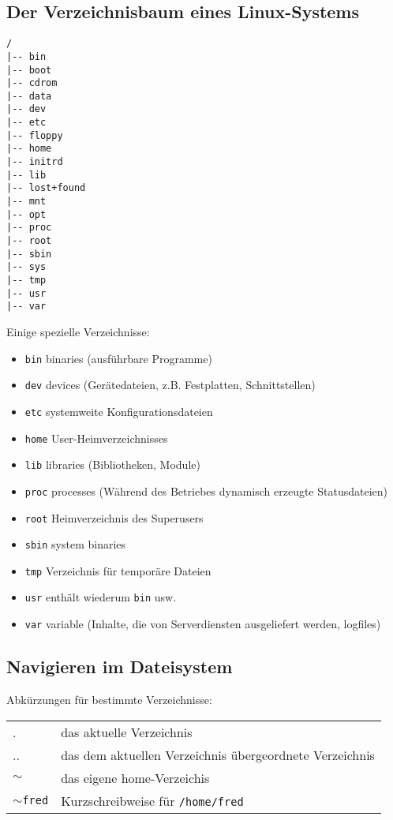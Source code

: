 \documentclass[11pt]{article}
\begin{document}
\subsection{Der Verzeichnisbaum eines Linux-Systems}
\begin{samepage}
\begin{verbatim}
/
|-- bin
|-- boot
|-- cdrom
|-- data
|-- dev
|-- etc
|-- floppy
|-- home
|-- initrd
|-- lib
|-- lost+found
|-- mnt
|-- opt
|-- proc
|-- root
|-- sbin
|-- sys
|-- tmp
|-- usr
|-- var

\end{verbatim}
Einige spezielle Verzeichnisse:
\begin{itemize}
  \item \texttt{bin} binaries (ausführbare Programme)
  \item \texttt{dev} devices (Gerätedateien, z.B. Festplatten, Schnittstellen)
  \item \texttt{etc} systemweite Konfigurationsdateien
  \item \texttt{home} User-Heimverzeichnisses
  \item \texttt{lib} libraries (Bibliotheken, Module)
  \item \texttt{proc} processes (Während des Betriebes dynamisch erzeugte Statusdateien)
  \item \texttt{root} Heimverzeichnis des Superusers
  \item \texttt{sbin} system binaries
  \item \texttt{tmp} Verzeichnis für temporäre Dateien
  \item \texttt{usr} enthält wiederum \texttt{bin} usw.
  \item \texttt{var} variable (Inhalte, die von Serverdiensten ausgeliefert werden, logfiles)
\end{itemize}
\end{samepage}

\subsection{Navigieren im Dateisystem}
Abkürzungen für bestimmte Verzeichnisse:\\

\begin{tabular}{ll}
. & das aktuelle Verzeichnis \\
.. & das dem aktuellen Verzeichnis übergeordnete Verzeichnis \\
$\sim$ & das eigene home-Verzeichis \\
$\sim$\texttt{fred} & Kurzschreibweise für \texttt{/home/fred} \\
\end{tabular} \\
\end{document}
